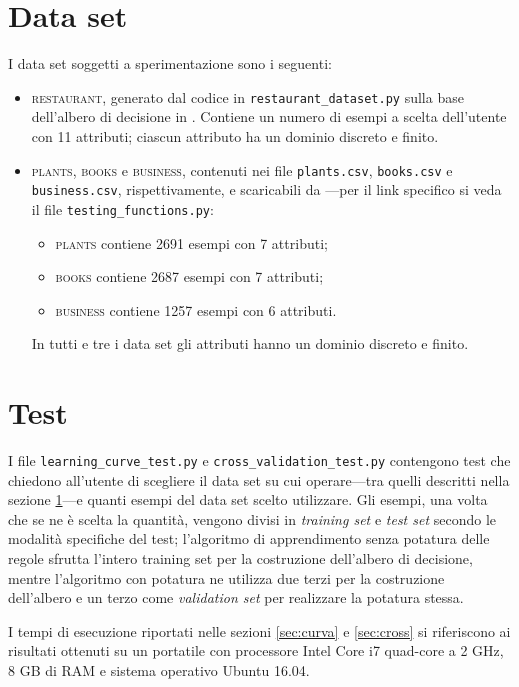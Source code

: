 \documentclass{article}
\newcommand{\restaurant}{\textsc{restaurant}}
\newcommand{\plants}{\textsc{plants}}
\newcommand{\books}{\textsc{books}}
\newcommand{\business}{\textsc{business}}
\begin{document}
	\section{Data set} \label{sec:dataset}
	I data set soggetti a sperimentazione sono i seguenti:
	\begin{itemize}
		\item \restaurant, generato dal codice in \texttt{restaurant\_dataset.py} sulla base dell'albero di decisione in \cite[Figura 18.2]{aima}. Contiene un numero di esempi a scelta dell'utente con 11 attributi; ciascun attributo ha un dominio discreto e finito.
		\item \plants, \books{} e \business, contenuti nei file \texttt{plants.csv}, \texttt{books.csv} e \texttt{business.csv}, rispettivamente, e scaricabili da \cite{mld}---per il link specifico si veda il file \texttt{testing\_functions.py}:
		\begin{itemize}
			\item \plants{} contiene 2691 esempi con 7 attributi;
			\item \books{} contiene 2687 esempi con 7 attributi;
			\item \business{} contiene 1257 esempi con 6 attributi.
		\end{itemize}
		In tutti e tre i data set gli attributi hanno un dominio discreto e finito.
	\end{itemize}
	
	\section{Test}
	I file \texttt{learning\_curve\_test.py} e \texttt{cross\_validation\_test.py} contengono test che chiedono all'utente di scegliere il data set su cui operare---tra quelli descritti nella sezione \ref{sec:dataset}---e quanti esempi del data set scelto utilizzare. Gli esempi, una volta che se ne è scelta la quantità, vengono divisi in \emph{training set} e \emph{test set} secondo le modalità specifiche del test; l'algoritmo di apprendimento senza potatura delle regole sfrutta l'intero training set per la costruzione dell'albero di decisione, mentre l'algoritmo con potatura ne utilizza due terzi per la costruzione dell'albero e un terzo come \emph{validation set} per realizzare la potatura stessa.
	
	I tempi di esecuzione riportati nelle sezioni \ref{sec:curva} e \ref{sec:cross} si riferiscono ai risultati ottenuti su un portatile con processore Intel Core i7 quad-core a 2 GHz, 8 GB di RAM e sistema operativo Ubuntu 16.04.
	
\end{document}
